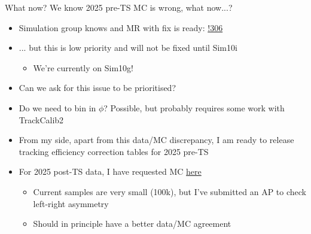 \documentclass[xcolor={dvipsnames}]{beamer}
\begin{document}
\begin{frame}{What now?}
  \vspace{0.0cm}
  {\Large We know 2025 pre-TS MC is wrong, what now...?}
  \vspace{0.2cm}
  \begin{itemize}
    \setlength\itemsep{0.8em}
    \item{Simulation group knows and MR with fix is ready: \href{https://gitlab.cern.ch/lhcb-conddb/SIMCOND/-/merge_requests/306}{!306}}
    \item{... but this is low priority and will not be fixed until Sim10i}
    \begin{itemize}
      \item[-]{We're currently on Sim10g!}
    \end{itemize}
    \item{Can we ask for this issue to be prioritised?}
    \item{Do we need to bin in $\phi$? Possible, but probably requires some work with TrackCalib2}
    \item{From my side, apart from this data/MC discrepancy, I am ready to release tracking efficiency correction tables for 2025 pre-TS}
    \item{For 2025 post-TS data, I have requested MC \href{https://gitlab.cern.ch/lhcb-rta/mc-requests/-/work_items?show=eyJpaWQiOiI1NSIsImZ1bGxfcGF0aCI6ImxoY2ItcnRhL21jLXJlcXVlc3RzIiwiaWQiOjM3NzE5NH0\%3D}{here}}
    \begin{itemize}
      \item[-]{Current samples are very small (100k), but I've submitted an AP to check left-right asymmetry}
      \item[-]{Should in principle have a better data/MC agreement}
    \end{itemize}
  \end{itemize}
\end{frame}
\end{document}
